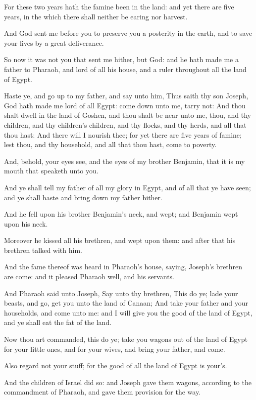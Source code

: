 \verse For these two years hath the famine been in the land: and yet there are five years, in the which there shall neither be earing nor harvest.

\verse And God sent me before you to preserve you a posterity in the earth, and to save your lives by a great deliverance.

\verse So now it was not you that sent me hither, but God: and he hath made me a father to Pharaoh, and lord of all his house, and a ruler throughout all the land of Egypt.

\verse Haste ye, and go up to my father, and say unto him, Thus saith thy son Joseph, God hath made me lord of all Egypt: come down unto me, tarry not: \verse And thou shalt dwell in the land of Goshen, and thou shalt be near unto me, thou, and thy children, and thy children's children, and thy flocks, and thy herds, and all that thou hast: \verse And there will I nourish thee; for yet there are five years of famine; lest thou, and thy household, and all that thou hast, come to poverty.

\verse And, behold, your eyes see, and the eyes of my brother Benjamin, that it is my mouth that speaketh unto you.

\verse And ye shall tell my father of all my glory in Egypt, and of all that ye have seen; and ye shall haste and bring down my father hither.

\verse And he fell upon his brother Benjamin's neck, and wept; and Benjamin wept upon his neck.

\verse Moreover he kissed all his brethren, and wept upon them: and after that his brethren talked with him.

\verse And the fame thereof was heard in Pharaoh's house, saying, Joseph's brethren are come: and it pleased Pharaoh well, and his servants.

\verse And Pharaoh said unto Joseph, Say unto thy brethren, This do ye; lade your beasts, and go, get you unto the land of Canaan; \verse And take your father and your households, and come unto me: and I will give you the good of the land of Egypt, and ye shall eat the fat of the land.

\verse Now thou art commanded, this do ye; take you wagons out of the land of Egypt for your little ones, and for your wives, and bring your father, and come.

\verse Also regard not your stuff; for the good of all the land of Egypt is your's.

\verse And the children of Israel did so: and Joseph gave them wagons, according to the commandment of Pharaoh, and gave them provision for the way.

